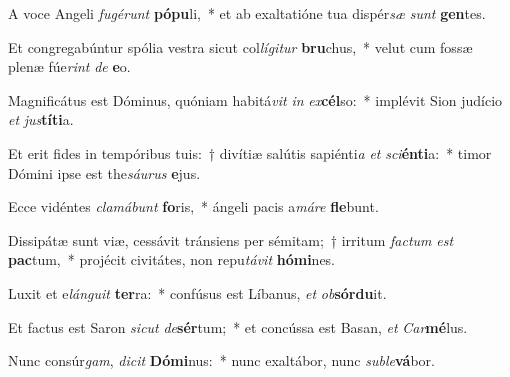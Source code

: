 \item A voce Angeli \textit{fu}\textit{gé}\textit{runt} \textbf{pó}\textbf{pu}li,~* et ab exaltatióne tua dispér\textit{sæ} \textit{sunt} \textbf{gen}tes.
\item Et congregabúntur spólia vestra sicut col\textit{lí}\textit{gi}\textit{tur} \textbf{bru}chus,~* velut cum fossæ plenæ fúe\textit{rint} \textit{de} \textbf{e}o.
\item Magnificátus est Dóminus, quóniam habitá\textit{vit} \textit{in} \textit{ex}\textbf{cél}so:~* implévit Sion judício \textit{et} \textit{jus}\textbf{tí}\textbf{ti}a.
\item Et erit fides in tempóribus tuis:~† divítiæ salútis sapiénti\textit{a} \textit{et} \textit{sci}\textbf{én}\textbf{ti}a:~* timor Dómini ipse est the\textit{sáu}\textit{rus} \textbf{e}jus.
\item Ecce vidéntes \textit{cla}\textit{má}\textit{bunt} \textbf{fo}ris,~* ángeli pacis a\textit{má}\textit{re} \textbf{fle}bunt.
\item Dissipátæ sunt viæ, cessávit tránsiens per sémitam;~† irritum \textit{fac}\textit{tum} \textit{est} \textbf{pac}tum,~* projécit civitátes, non repu\textit{tá}\textit{vit} \textbf{hó}\textbf{mi}nes.
\item Luxit et e\textit{lán}\textit{gu}\textit{it} \textbf{ter}ra:~* confúsus est Líbanus, \textit{et} \textit{ob}\textbf{sór}\textbf{du}it.
\item Et factus est Saron \textit{sic}\textit{ut} \textit{de}\textbf{sér}tum;~* et concússa est Basan, \textit{et} \textit{Car}\textbf{mé}lus.
\item Nunc consúr\textit{gam}, \textit{di}\textit{cit} \textbf{Dó}\textbf{mi}nus:~* nunc exaltábor, nunc \textit{sub}\textit{le}\textbf{vá}bor.
